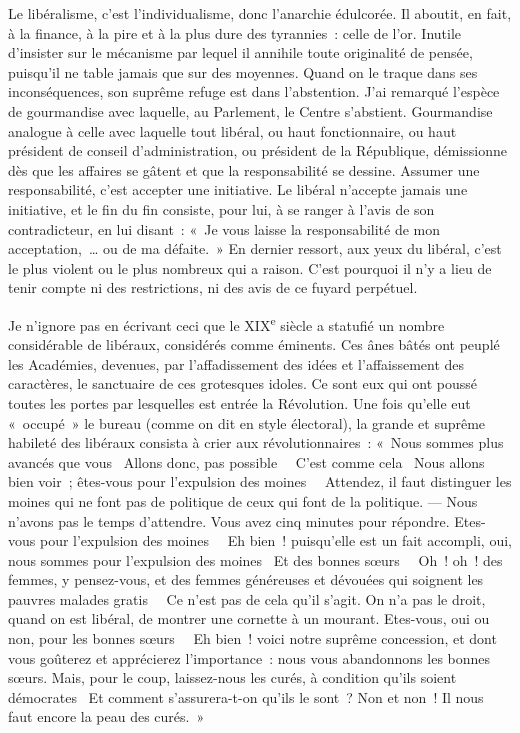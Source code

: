 \documentclass[french,twoside]{book} %
\begin{document}
Le libéralisme, c’est l’individualisme, donc l’anarchie édulcorée. Il aboutit, en fait, à la finance, à la pire et à la plus dure des tyrannies : celle de l’or. Inutile d’insister sur le mécanisme par lequel il annihile toute originalité de pensée, puisqu’il ne table jamais que sur des moyennes. Quand on le traque dans ses inconséquences, son suprême refuge est dans l’abstention. J’ai remarqué l’espèce de gourmandise avec laquelle, au Parlement, le Centre s’abstient. Gourmandise analogue à celle avec laquelle tout libéral, ou haut fonctionnaire, ou haut président de conseil d’administration, ou président de la République, démissionne dès que les affaires se gâtent et que la responsabilité se dessine. Assumer une responsabilité, c’est accepter une initiative. Le libéral n’accepte jamais une initiative, et le fin du fin consiste, pour lui, à se ranger à l’avis de son contradicteur, en lui disant : « Je vous laisse la responsabilité de mon acceptation, … ou de ma défaite. » En dernier ressort, aux yeux du libéral, c’est le plus violent ou le plus nombreux qui a raison. C’est pourquoi il n’y a lieu de tenir compte ni des restrictions, ni des avis de ce fuyard perpétuel.\par
Je n’ignore pas en écrivant ceci que le XIX\textsuperscript{e} siècle a statufié un nombre considérable de libéraux, considérés comme éminents. Ces ânes bâtés ont peuplé les Académies, devenues, par l’affadissement des idées et l’affaissement des caractères, le sanctuaire de ces grotesques idoles. Ce sont eux qui ont poussé toutes les portes par lesquelles est entrée la Révolution. Une fois qu’elle eut « occupé » le bureau (comme on dit en style électoral), la grande et suprême habileté des libéraux consista à crier aux révolutionnaires : « Nous sommes plus avancés que vous  Allons donc, pas possible   C’est comme cela  Nous allons bien voir ; êtes-vous pour l’expulsion des moines   Attendez, il faut distinguer les moines qui ne font pas de politique de ceux qui font de la politique. — Nous n’avons pas le temps d’attendre. Vous avez cinq minutes pour répondre. Etes-vous pour l’expulsion des moines   Eh bien ! puisqu’elle est un fait accompli, oui, nous sommes pour l’expulsion des moines  Et des bonnes sœurs   Oh ! oh ! des femmes, y pensez-vous, et des femmes généreuses et dévouées qui soignent les pauvres malades gratis   Ce n’est pas de cela qu’il s’agit. On n’a pas le droit, quand on est libéral, de montrer une cornette à un mourant. Etes-vous, oui ou non, pour les bonnes sœurs   Eh bien ! voici notre suprême concession, et dont vous goûterez et apprécierez l’importance : nous vous abandonnons les bonnes sœurs. Mais, pour le coup, laissez-nous les curés, à condition qu’ils soient démocrates  Et comment s’assurera-t-on qu’ils le sont ? Non et non ! Il nous faut encore la peau des curés. »\par
\end{document}
